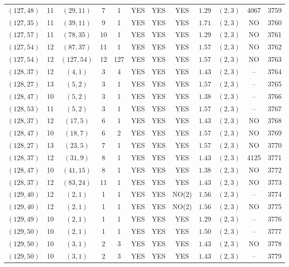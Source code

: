 \begin{longtable}{|c|c|c|c|c|c|c|c|c|c|c|c|}
$(127,48)$ & 11 & $(29,11)$ & 7 & 1 & YES & YES & YES & $1.29$ & $(2,3)$ & 4067 & 3759\\
$(127,35)$ & 11 & $(39,11)$ & 9 & 1 & YES & YES & YES & $1.71$ & $(2,3)$ & NO & 3760\\
$(127,57)$ & 11 & $(78,35)$ & 10 & 1 & YES & YES & YES & $1.29$ & $(2,3)$ & NO & 3761\\
$(127,54)$ & 12 & $(87,37)$ & 11 & 1 & YES & YES & YES & $1.57$ & $(2,3)$ & NO & 3762\\
$(127,54)$ & 12 & $(127,54)$ & 12 & 127 & YES & YES & YES & $1.57$ & $(2,3)$ & NO & 3763\\
$(128,37)$ & 12 & $(4,1)$ & 3 & 4 & YES & YES & YES & $1.43$ & $(2,3)$ & -- & 3764\\
$(128,27)$ & 13 & $(5,2)$ & 3 & 1 & YES & YES & YES & $1.57$ & $(2,3)$ & -- & 3765\\
$(128,47)$ & 10 & $(5,2)$ & 3 & 1 & YES & YES & YES & $1.38$ & $(2,3)$ & -- & 3766\\
$(128,53)$ & 11 & $(5,2)$ & 3 & 1 & YES & YES & YES & $1.57$ & $(2,3)$ & -- & 3767\\
$(128,37)$ & 12 & $(17,5)$ & 6 & 1 & YES & YES & YES & $1.43$ & $(2,3)$ & NO & 3768\\
$(128,47)$ & 10 & $(18,7)$ & 6 & 2 & YES & YES & YES & $1.57$ & $(2,3)$ & NO & 3769\\
$(128,27)$ & 13 & $(23,5)$ & 7 & 1 & YES & YES & YES & $1.57$ & $(2,3)$ & NO & 3770\\
$(128,37)$ & 12 & $(31,9)$ & 8 & 1 & YES & YES & YES & $1.43$ & $(2,3)$ & 4125 & 3771\\
$(128,47)$ & 10 & $(41,15)$ & 8 & 1 & YES & YES & YES & $1.38$ & $(2,3)$ & NO & 3772\\
$(128,37)$ & 12 & $(83,24)$ & 11 & 1 & YES & YES & YES & $1.43$ & $(2,3)$ & NO & 3773\\
$(129,40)$ & 12 & $(2,1)$ & 1 & 1 & YES & YES & NO(2) & $1.56$ & $(2,3)$ & -- & 3774\\
$(129,40)$ & 12 & $(2,1)$ & 1 & 1 & YES & YES & NO(2) & $1.56$ & $(2,3)$ & NO & 3775\\
$(129,49)$ & 10 & $(2,1)$ & 1 & 1 & YES & YES & YES & $1.29$ & $(2,3)$ & -- & 3776\\
$(129,50)$ & 10 & $(2,1)$ & 1 & 1 & YES & YES & YES & $1.50$ & $(2,3)$ & -- & 3777\\
$(129,50)$ & 10 & $(3,1)$ & 2 & 3 & YES & YES & YES & $1.43$ & $(2,3)$ & NO & 3778\\
$(129,50)$ & 10 & $(3,1)$ & 2 & 3 & YES & YES & YES & $1.43$ & $(2,3)$ & -- & 3779\\

\end{longtable}
